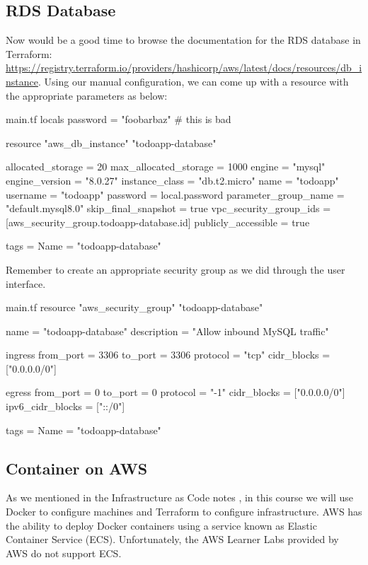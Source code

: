 \documentclass{csse4400}
\begin{document}
\subsection{RDS Database}

Now would be a good time to browse the documentation for the RDS database in Terraform:
\url{https://registry.terraform.io/providers/hashicorp/aws/latest/docs/resources/db_instance}.
Using our manual configuration,
we can come up with a resource with the appropriate parameters as below:

\begin{code}[language=terraform]{main.tf}
locals {
  password = "foobarbaz" # this is bad
}

resource "aws_db_instance" "todoapp-database" {
  allocated_storage      = 20
  max_allocated_storage  = 1000
  engine                 = "mysql"
  engine_version         = "8.0.27"
  instance_class         = "db.t2.micro"
  name                   = "todoapp"
  username               = "todoapp"
  password               = local.password
  parameter_group_name   = "default.mysql8.0"
  skip_final_snapshot    = true
  vpc_security_group_ids = [aws_security_group.todoapp-database.id]
  publicly_accessible    = true

  tags = {
    Name = "todoapp-database"
  }
}
\end{code}

\noindent Remember to create an appropriate security group as we did through the user interface.

\begin{code}[language=terraform]{main.tf}
resource "aws_security_group" "todoapp-database" {
  name        = "todoapp-database"
  description = "Allow inbound MySQL traffic"

  ingress {
    from_port        = 3306
    to_port          = 3306
    protocol         = "tcp"
    cidr_blocks      = ["0.0.0.0/0"]
  }

  egress {
    from_port        = 0
    to_port          = 0
    protocol         = "-1"
    cidr_blocks      = ["0.0.0.0/0"]
    ipv6_cidr_blocks = ["::/0"]
  }

  tags = {
    Name = "todoapp-database"
  }
}
\end{code}

\subsection{Container on AWS}

As we mentioned in the Infrastructure as Code notes \cite{iac-notes},
in this course we will use Docker to configure machines and Terraform to configure infrastructure.
AWS has the ability to deploy Docker containers using a service known as Elastic Container Service (ECS).
Unfortunately, the AWS Learner Labs provided by AWS do not support ECS.
\end{document}
